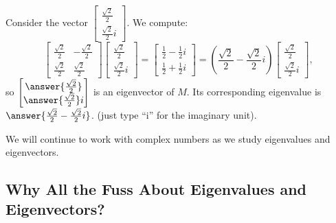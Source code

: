 \documentclass{ximera}
\begin{document}
\begin{example}
    
    
    
    
    
    
Consider the vector $\begin{bmatrix} \frac{\sqrt{2}}{2}\\ \frac{\sqrt{2}}{2} i \end{bmatrix}$.  We compute:
$$\begin{bmatrix}
\frac{\sqrt{2}}{2} & -\frac{\sqrt{2}}{2}\\
\frac{\sqrt{2}}{2} & \frac{\sqrt{2}}{2}
\end{bmatrix} \begin{bmatrix} \frac{\sqrt{2}}{2}\\ \frac{\sqrt{2}}{2} i \end{bmatrix} =
\begin{bmatrix} \frac{1}{2}-\frac{1}{2} i\\ \frac{1}{2}+ \frac{1}{2} i \end{bmatrix}= (\frac{\sqrt{2}}{2}-\frac{\sqrt{2}}{2}i) \begin{bmatrix} \frac{\sqrt{2}}{2}\\ \frac{\sqrt{2}}{2} i \end{bmatrix},$$
so \(\begin{bmatrix} \answer{\frac{\sqrt{2}}{2}}\\ \answer{\frac{\sqrt{2}}{2}}i \end{bmatrix}\) is an eigenvector of \(M\). Its corresponding eigenvalue is \(\answer{\frac{\sqrt{2}}{2}-\frac{\sqrt{2}}{2}i}\). (just type ``i'' for the imaginary unit).
\end{example}
    
We will continue to work with complex numbers as we study eigenvalues and eigenvectors.
    
\subsection*{Why All the Fuss About Eigenvalues and Eigenvectors?}
    
\end{document}
